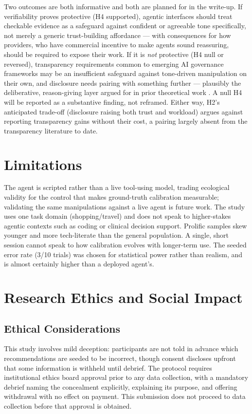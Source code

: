 \documentclass[manuscript]{acmart}
\begin{document}
Two outcomes are both informative and both are planned for in the write-up. If verifiability proves protective (H4 supported), agentic interfaces should treat checkable evidence as a safeguard against confident or agreeable tone specifically, not merely a generic trust-building affordance --- with consequences for how providers, who have commercial incentive to make agents sound reassuring, should be required to expose their work. If it is \emph{not} protective (H4 null or reversed), transparency requirements common to emerging AI governance frameworks may be an insufficient safeguard against tone-driven manipulation on their own, and disclosure needs pairing with something further --- plausibly the deliberative, reason-giving layer argued for in prior theoretical work \cite{delibtrust2026, paris2026donttrust}. A null H4 will be reported as a substantive finding, not reframed. Either way, H2's anticipated trade-off (disclosure raising both trust and workload) argues against reporting transparency gains without their cost, a pairing largely absent from the transparency literature to date.

\section{Limitations}

The agent is scripted rather than a live tool-using model, trading ecological validity for the control that makes ground-truth calibration measurable; validating the same manipulations against a live agent is future work. The study uses one task domain (shopping/travel) and does not speak to higher-stakes agentic contexts such as coding or clinical decision support. Prolific samples skew younger and more tech-literate than the general population. A single, short session cannot speak to how calibration evolves with longer-term use. The seeded error rate (3/10 trials) was chosen for statistical power rather than realism, and is almost certainly higher than a deployed agent's.

\section{Research Ethics and Social Impact}

\subsection{Ethical Considerations}
This study involves mild deception: participants are not told in advance which recommendations are seeded to be incorrect, though consent discloses upfront that some information is withheld until debrief. The protocol requires institutional ethics board approval prior to any data collection, with a mandatory debrief naming the concealment explicitly, explaining its purpose, and offering withdrawal with no effect on payment. This submission does not proceed to data collection before that approval is obtained.
\end{document}
